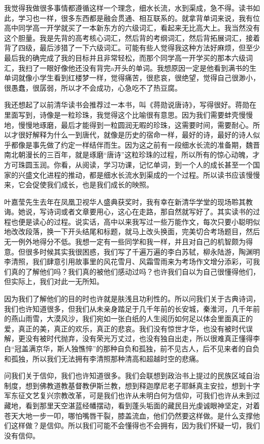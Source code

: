 \documentclass[openany,scheme = chinese, linespread = 1.5]{ctexbook}
\begin{document}
我觉得我做很多事情都遵循这样一个理念，细水长流，水到渠成，急不得。读书如此，学习也一样，很多东西都是融会贯通、相互联系的。就拿背单词来说，我有位高中同学高一开学就买了一本新东方的六级词汇，看起来无比高大上。我当然没有这个胆量。我是先背的高考核心词汇，然后背的考纲词汇，然后背拓展词汇，接着背了四级，最后涉猎了一下六级词汇。可能有些人觉得我这种方法好麻烦，但至少最后我的确完成了我的目标并且非常轻松，而那个同学高一开学买的那本六级词汇，我扫了一眼好像他还没有背完a开头的单词。我想原因一定是他看到满书的生单词就像小学生看到红楼梦一样，觉得痛苦，很悲哀，很绝望，觉得自己很渺小，很愚蠢，很孱弱，所以才不会成功，心急吃不了热豆腐。

我还想起了以前清华读书会推荐过一本书，叫《蒋勋说唐诗》，写得很好。蒋勋在里面写到，诗像是一粒珍珠，我觉得这个比喻很有意思。因为我们需要蚌壳慢慢地，慢慢地琢磨，最后才能得到一粒圆润无暇的珍珠，这需要时间，需要耐心。所以才很好解释为什么一到唐代，就像是历史的宿命一样，最好的诗，最好的诗人似乎都像是事先做了约定一样结伴而生。因为这之前有一段细水长流的准备期，魏晋南北朝漫长的三百年，就是琢磨“唐诗”这粒珍珠的过程，所以所有的惊心动魄，才方可珠圆玉润。你看，从阅读，学习功课，记忆单词，到一个人的成长甚至一个国家的兴盛文化进程的推动，都是细水长流水到渠成的一个过程。所以读书应该慢慢来，它会促使我们成长，也是我们成长的映照。

叶嘉莹先生去年在凤凰卫视华人盛典获奖时，我有幸在新清华学堂的现场聆其教诲。她说，写诗词或者文章要用心，这心在走路，那自然就写好了。其实读书的过程也便是读心的过程。说实话，高中以来我写过一些万能作文，每次只要小聪明似地改改段落，换一下开头结尾和标题，就马上改头换面，完美切合考场题目，然后无一例外地得分不低。我想一定有一些同学和我一样，并且对自己的机智颇为得意。但很多时候其实我很困惑，我们写了千遍万遍的李白苏轼，柳永陆游，陶渊明李清照，我们肆意引用故事里的风花雪月、风霜雪雨来为考场作文增分添彩，可我们真的了解他们吗？我们真的被他们感动过吗？也许我们自以为自己很懂得他们，但实际上，我们对此一无所知。

因为我们了解他们的目的时也许就是肤浅且功利性的。所以问我们关于古典诗词，我们也许知道很多，但我们从未亲身踏足于几千年前的长安城，秦淮河，几千年前的燕山雨雪，大漠风沙，我们宛如一张白纸的人生阅历如何足以体会里面真正的爱，真正的美，真正的欢乐，真正的悲哀。我们没有惊世才华，也没有被时代误解，更没有被时代抛弃，没有荣光万丈过，也没有独自出走，所以很难真正懂得李白“冠盖满京华，斯人独憔悴”的那种自负和孤独，前不见古人，后不见来者的自负和孤独，所以我们无法拥有李清照那种清高和超越时空的悲痛。

问我们关于信仰，我们也许知道很多。我们会联想到政治书上提过的民族区域自治制度，想到佛教道教基督教伊斯兰教，想到释迦摩尼老子耶稣真主安拉，想到十字军东征文艺复兴宗教改革，可是我们也许从未明白何为信仰，可我们也许从未到过藏地，看到那里天空湛蓝经幡摆动，看到蓬头垢面的藏民目光虔诚眼神坚定，对着苍天大地一步一叩，哪怕嘴唇干裂，膝盖流血，他们仍然要这样做。是什么支撑他们这样做？是信仰。所以我们可能不会懂得也不会拥有，因为我们怀疑一切，我们没有信仰。
\end{document}
